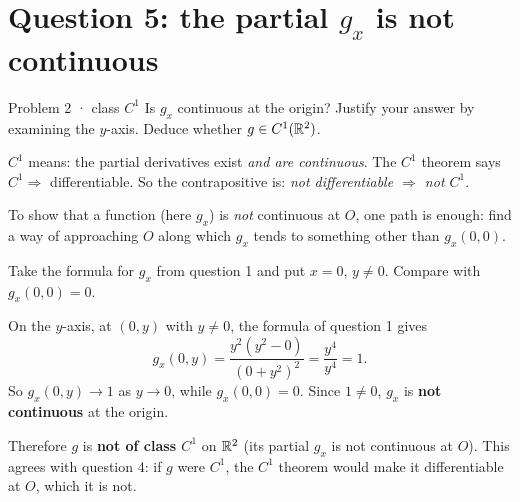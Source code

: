 \section{Question 5: the partial $g_x$ is not continuous}

\begin{question}{Problem 2 \;·\; class $C^1$}
Is $g_x$ continuous at the origin? Justify your answer by examining the $y$-axis. Deduce whether
$g\in C^1(\mathbb{R}^2)$.
\end{question}

\begin{lesson}
\textbf{$C^1$} means: the partial derivatives exist \emph{and are continuous}. The $C^1$ theorem
says $C^1\Rightarrow$ differentiable. So the contrapositive is: \emph{not differentiable $\Rightarrow$ not $C^1$}.

To show that a function (here $g_x$) is \emph{not} continuous at $O$, one path is enough: find a way
of approaching $O$ along which $g_x$ tends to something other than $g_x(0,0)$.
\end{lesson}

\begin{howto}
Take the formula for $g_x$ from question 1 and put $x=0$, $y\ne0$. Compare with $g_x(0,0)=0$.
\end{howto}

\begin{answer}
On the $y$-axis, at $(0,y)$ with $y\ne0$, the formula of question 1 gives
\[
  g_x(0,y)=\frac{y^2(y^2-0)}{(0+y^2)^2}=\frac{y^4}{y^4}=1 .
\]
So $g_x(0,y)\to1$ as $y\to0$, while $g_x(0,0)=0$. Since $1\ne0$, $g_x$ is \textbf{not continuous}
at the origin.

Therefore $g$ is \textbf{not of class $C^1$} on $\mathbb{R}^2$ (its partial $g_x$ is not continuous at $O$).
This agrees with question 4: if $g$ were $C^1$, the $C^1$ theorem would make it differentiable at
$O$, which it is not.
\end{answer}

\begin{center}
\end{center}

